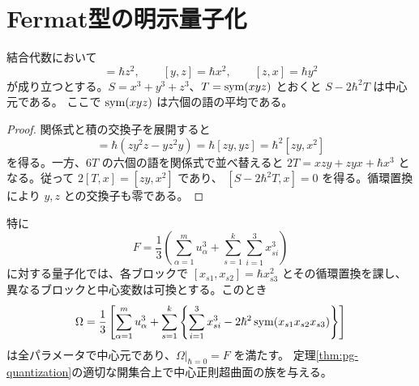 \section{Fermat型の明示量子化}\label{sec:pg-special}
\begin{lemma}\label{lem:pg-fermat-center}
結合代数において
\begin{equation}
[x,y]=\hbar z^2,\qquad [y,z]=\hbar x^2,\qquad [z,x]=\hbar y^2
\end{equation}
が成り立つとする。$S=x^3+y^3+z^3$、$T=\operatorname{sym}(xyz)$ とおくと $S-2\hbar^2T$ は中心元である。
ここで $\operatorname{sym}(xyz)$ は六個の語の平均である。
\end{lemma}
\begin{proof}
関係式と積の交換子を展開すると
\begin{equation}
[S,x]=\hbar(zy^2z-yz^2y)=\hbar[zy,yz]=\hbar^2[zy,x^2]
\end{equation}
を得る。一方、$6T$ の六個の語を関係式で並べ替えると
$2T=xzy+zyx+\hbar x^3$ となる。従って $2[T,x]=[zy,x^2]$ であり、
$[S-2\hbar^2T,x]=0$ を得る。循環置換により $y,z$ との交換子も零である。
\end{proof}
特に
\begin{equation}\label{eq:pg-fermat}
F=\frac13\left(\sum_{\alpha=1}^m u_\alpha^3+
\sum_{s=1}^k\sum_{i=1}^3x_{si}^3\right)
\end{equation}
に対する量子化では、各ブロックで $[x_{s1},x_{s2}]=\hbar x_{s3}^2$ とその循環置換を課し、
異なるブロックと中心変数は可換とする。このとき
\begin{equation}\label{eq:pg-fermat-center}
\Omega=\frac13\left[\sum_{\alpha=1}^m u_\alpha^3+
\sum_{s=1}^k\left\{\sum_{i=1}^3x_{si}^3-2\hbar^2\operatorname{sym}(x_{s1}x_{s2}x_{s3})\right\}\right]
\end{equation}
は全パラメータで中心元であり、$\Omega|_{\hbar=0}=F$ を満たす。
定理\ref{thm:pg-quantization}の適切な開集合上で中心正則超曲面の族を与える。


